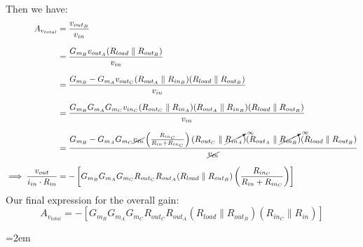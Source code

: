 \documentclass[12pt, fleqn]{article}
\begin{document}
\begin{enumerate}[label=(\alph*)]
{    Then we have:
    \begin{align*}
        A_{v_{total}} &= \frac{v_{{out}_B}}{v_{in}}\\[0.25cm]
        &= \frac{G_{m_B} v_{{out}_A}(R_{load} \parallel R_{{out}_B})}{v_{in}}\\[0.25cm]
        &= \frac{G_{m_B} -G_{m_A} v_{{out}_C}(R_{{out}_A} \parallel R_{{in}_B})(R_{load} \parallel R_{{out}_B})}{v_{in}}\\[0.25cm]
        &= \frac{G_{m_B} G_{m_A} G_{m_C} v_{{in}_C}(R_{{out}_C} \parallel R_{{in}_A})(R_{{out}_A} \parallel R_{{in}_B})(R_{load} \parallel R_{{out}_B})}{v_{in}}\\[0.25cm]
        &= \frac{G_{m_B} -G_{m_A} G_{m_C} \cancel{v_{in}} \left(\frac{R_{{in}_C}}{R_{in} + R_{{in}_C}}\right)(R_{{out}_C} \parallel \cancelto{\infty}{R_{{in}_A}})(R_{{out}_A} \parallel \cancelto{\infty}{R_{{in}_B}})(R_{load} \parallel R_{{out}_B})}{\cancel{v_{in}}}\\[0.25cm]
        \implies \frac{v_{out}}{i_{in} \cdot R_{in}} &= -\left[G_{m_B} G_{m_A} G_{m_C} R_{{out}_C} R_{{out}_A} (R_{load} \parallel R_{{out}_B}) \left(\frac{R_{{in}_C}}{R_{in} + R_{{in}_C}}\right)\right]
    \end{align*}
    }
    Our final expression for the overall gain:
    \begin{equation}
        \boxed{A_{v_{total}} = -\left[G_{m_B} G_{m_A} G_{m_C} R_{{out}_C} R_{{out}_A} (R_{load} \parallel R_{{out}_B}) \left(R_{{in}_C} \parallel R_{in}\right)\right]}
    \end{equation}
\end{enumerate}
\newpage
\appendix

\newpage
{}
\emergencystretch=2em
\nocite{*}
\printbibliography
\end{document}
